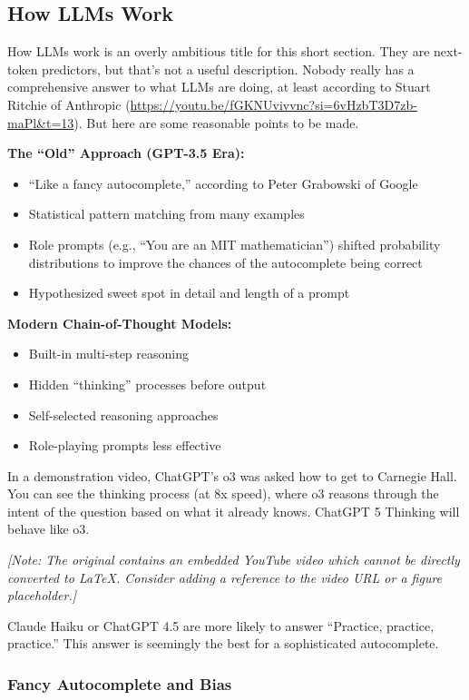 \subsection{How LLMs Work}

How LLMs work is an overly ambitious title for this short section. They are next-token predictors, but that's not a useful description. Nobody really has a comprehensive answer to what LLMs are doing, at least according to Stuart Ritchie of Anthropic (\url{https://youtu.be/fGKNUvivvnc?si=6vHzbT3D7zb-maPl&t=13}). But here are some reasonable points to be made.

\textbf{The ``Old'' Approach (GPT-3.5 Era):}
\begin{itemize}
\item ``Like a fancy autocomplete,'' according to Peter Grabowski of Google
\item Statistical pattern matching from many examples
\item Role prompts (e.g., ``You are an MIT mathematician'') shifted probability distributions to improve the chances of the autocomplete being correct
\item Hypothesized sweet spot in detail and length of a prompt
\end{itemize}

\textbf{Modern Chain-of-Thought Models:}
\begin{itemize}
\item Built-in multi-step reasoning
\item Hidden ``thinking'' processes before output
\item Self-selected reasoning approaches
\item Role-playing prompts less effective
\end{itemize}

In a demonstration video, ChatGPT's o3 was asked how to get to Carnegie Hall. You can see the thinking process (at 8x speed), where o3 reasons through the intent of the question based on what it already knows. ChatGPT 5 Thinking will behave like o3.

\textit{[Note: The original contains an embedded YouTube video which cannot be directly converted to LaTeX. Consider adding a reference to the video URL or a figure placeholder.]}

Claude Haiku or ChatGPT 4.5 are more likely to answer ``Practice, practice, practice.'' This answer is seemingly the best for a sophisticated autocomplete.

\subsubsection{Fancy Autocomplete and Bias}

